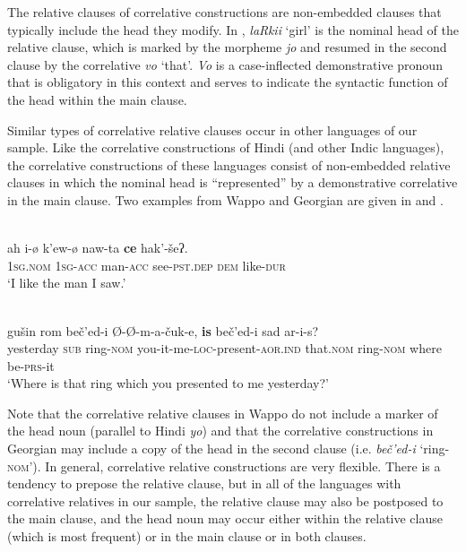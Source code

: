 \documentclass[output=paper,colorlinks,citecolor=brown]{langscibook}
\begin{document}
The relative clauses of correlative constructions are non-embedded clauses that typically include the head they modify. In , \textit{laRkii} ‘girl’ is the nominal head of the relative clause, which is marked by the morpheme \textit{jo} and resumed in the second clause by the correlative \textit{vo} ‘that’. \textit{Vo} is a case-inflected demonstrative pronoun that is obligatory in this context and serves to indicate the syntactic function of the head within the main clause.

Similar types of correlative relative clauses occur in other languages of our sample. Like the correlative constructions of Hindi (and other Indic languages), the correlative constructions of these languages consist of non-embedded relative clauses in which the nominal head is “represented” by a demonstrative correlative in the main clause. Two examples from Wappo and Georgian are given in  and .

\ea\label{ex:diessel:42}
\\
\gll ah     {\ob}i-ø   k'ew-ø  naw-ta{\cb}   \textbf{ce}    hak'-šeʔ.\\
     \textsc{1sg.nom}   {\db}\textsc{1sg-acc}   man-\textsc{acc}   see-\textsc{pst.dep}   \textsc{dem} like-\textsc{dur}\\
\glt ‘I like the man I saw.’
\z

\ea\label{ex:diessel:43}
\\
\gll {\ob}gušin  rom beč’ed-i   {\op}Ø-Ø-{\cp}m-a-čuk-e{\cb}, \textbf{is}     {\op}beč’ed-i{\cp}    sad  ar-i-s?\\
     {\db}yesterday  \textsc{sub}  ring-\textsc{nom} {\db}you-it-me-\textsc{loc}-present-\textsc{aor.ind} that.\textsc{nom}   {\db}ring-\textsc{nom}  where  be-\textsc{prs}-it\\
\glt ‘Where is that ring which you presented to me yesterday?’
\z

Note that the correlative relative clauses in Wappo do not include a marker of the head noun (parallel to Hindi \textit{yo}) and that the correlative constructions in Georgian may include a copy of the head in the second clause (i.e. \textit{beč’ed-i} ‘ring-\textsc{nom}’). In general, correlative relative constructions are very flexible. There is a tendency to prepose the relative clause, but in all of the languages with correlative relatives in our sample, the relative clause may also be postposed to the main clause, and the head noun may occur either within the relative clause (which is most frequent) or in the main clause or in both clauses.
\end{document}
